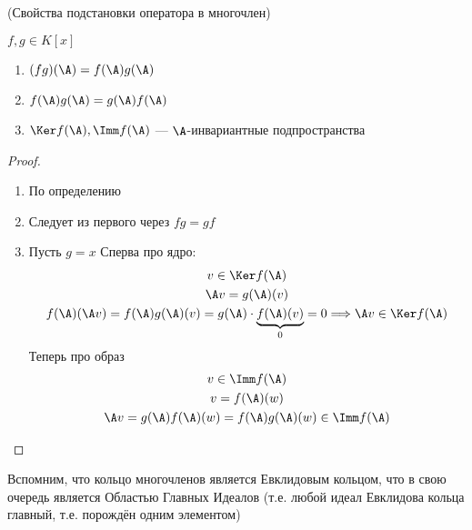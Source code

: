 \begin{theorem}(Свойства подстановки оператора в многочлен)

    $ f, g \in K[x] $
    \begin{enumerate}
        \item $ (fg)(\A) = f(\A) g(\A) $
        \item $ f(\A) g(\A) = g(\A) f(\A) $
        \item $ \Ker f(\A) , \Imm f(\A)$  ---  $\A $-инвариантные подпространства
    \end{enumerate}
    \begin{proof} \quad
    
    \begin{enumerate}
        \item По определению
        \item Следует из первого через $fg = gf$
        \item Пусть $g = x$
        \quad Сперва про ядро: \\
        \begin{gather*}
            v \in \Ker f(\A) \\
            \A v = g(\A) (v) \\
            f(\A) (\A v) = f(\A) g(\A) (v) = g(\A) \cdot \underbrace{f(\A) (v)}_{\text{$ 0 $}} = 0 \Longrightarrow \A v \in \Ker f(\A) \\
        \end{gather*}
        \quad Теперь про образ \\
        \begin{gather*}
            v \in \Imm f(\A) \\
            v = f(\A) (w) \\
            \A v = g(\A) f(\A) (w) = f(\A) g(\A) (w) \in \Imm f(\A)
        \end{gather*}
    \end{enumerate}
    \end{proof}
\end{theorem}

Вспомним, что кольцо многочленов является Евклидовым кольцом, что в свою очередь является Областью Главных Идеалов (т.е. любой идеал Евклидова кольца главный, т.е. порождён одним элементом)


